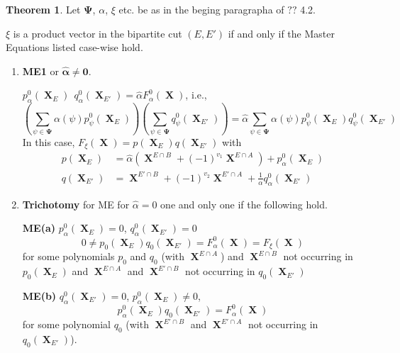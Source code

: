 \documentclass[a4paper,12pt]{article}
\DeclareMathOperator{\x}{\mathrm{X}}
\theoremstyle{definition}
\theoremstyle{underlinethm}
\newtheorem{thm}{Theorem}[section]
\theoremstyle{definition}
\begin{document}
\begin{thm}\label{thm-4.3}
Let $\boldsymbol{\Psi}$, $\alpha$, $\xi$ etc. be as in the beging paragrapha of $??$ 4.2.

$\xi$ is a product vector in the bipartite cut $(E, E')$ if and only if the Master Equations listed case-wise hold.
\begin{enumerate}[label = (\roman*)]
\item \textbf{ME1} or ${\boldsymbol{\hat{\alpha} \neq 0}}$.

$p_{\alpha}^{0}(\boldsymbol{\x}_{E}) ~~q_{\alpha}^{0} (\boldsymbol{\x}_{E'}) = \hat{\alpha} F_{\alpha}^{0} (\boldsymbol{\x})$, i.e.,
\begin{equation}
\left(\sum_{\psi \in \boldsymbol{\Psi}} \alpha(\psi)p_{\psi}^{0} (\boldsymbol{\x}_{E})\right) \left(\sum_{\psi \in \boldsymbol{\Psi}}  q_{\psi}^{0} (\boldsymbol{\x}_{E'})\right) = \hat{\alpha} \sum_{\psi \in \boldsymbol{\Psi}} \alpha(\psi) p_{\psi}^{0} (\boldsymbol{\x}_{E}) q_{\psi}^{0}(\boldsymbol{\x}_{E'})\tag{4.44}\label{eq-4.44}
\end{equation}
In this case, $F_{\xi}(\boldsymbol{\x}) = p(\boldsymbol{\x}_{E}) q(\boldsymbol{\x}_{E'})$ with
\begin{align*}
p(\boldsymbol{\x}_{E}) &= \hat{\alpha} \left(\boldsymbol{\x}^{E \cap B} + (-1)^{v_{1}} \boldsymbol{\x}^{E \cap A} \right) + p_{\alpha}^{0}(\boldsymbol{\x}_{E})\\
q(\boldsymbol{\x}_{E'}) &= \boldsymbol{\x}^{E' \cap B} + (-1)^{v_{2}} \boldsymbol{\x}^{E' \cap A} + \frac{1}{\alpha} q_{\alpha}^{0} (\boldsymbol{\x}_{E'})\tag{4.45}\label{eq-4.45}
\end{align*}

\item \textbf{Trichotomy} for ME for $\hat{\alpha} = 0$ one and only one if the following hold.

\textbf{ME(a)} $p_{\alpha}^{0} (\boldsymbol{\x}_{E}) = 0$, $q_{\alpha}^{0} (\boldsymbol{\x}_{E'}) = 0$
\begin{equation}
0 \neq p_{0} (\boldsymbol{\x}_{E}) q_{0}(\boldsymbol{\x}_{E'}) = F_{\alpha}^{0} (\boldsymbol{\x}) = F_{\xi}(\boldsymbol{\x})\tag{4.46}\label{eq-4.46}
\end{equation}
for some polynomials $p_{0}$ and $q_{0}$ (with $\boldsymbol{\x}^{E \cap A}$) and $\boldsymbol{\x}^{E \cap B}$ not occurring in $p_{0}(\boldsymbol{\x}_{E})$ and $\boldsymbol{\x}^{E \cap A}$ and $\boldsymbol{\x}^{E' \cap B}$ not occurring in $q_{0}(\boldsymbol{\x}_{E'})$

\textbf{ME(b)} $q_{\alpha}^{0} (\boldsymbol{\x}_{E'}) = 0$, $p_{\alpha}^{0}(\boldsymbol{\x}_{E}) \neq 0$,
\begin{equation}
p_{\alpha}^{0}(\boldsymbol{\x}_{E}) q_{0}(\boldsymbol{\x}_{E'}) = F_{\alpha}^{0} (\boldsymbol{\x}) \tag{4.47}\label{eq-4.47}
\end{equation}
for some polynomial $q_{0}$ (with $\boldsymbol{\x}^{E' \cap B}$ and $\boldsymbol{\x}^{E' \cap A}$ not occurring in $q_{0}(\boldsymbol{\x}_{E'})$).


\end{enumerate}
\end{thm}
\end{document}
